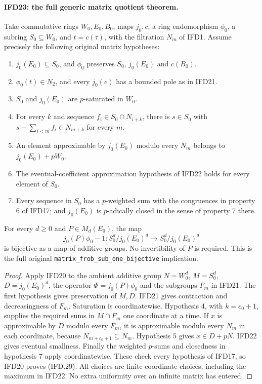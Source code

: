 \paragraph{IFD23: the full generic matrix quotient theorem.}
\label{claim:IFD23}
Take commutative rings $W_0,E_0,B_0$, maps $j_0,c$, a ring
endomorphism $\phi_0$, a subring $S_0\subseteq W_0$, and
$t=c(\tau)$, with the filtration $N_m$ of IFD1.
Assume precisely the following original matrix hypotheses:
\begin{enumerate}
\item $j_0(E_0)\subseteq S_0$, and $\phi_0$ preserves $S_0$,
      $j_0(E_0)$ and $c(B_0)$.
\item $\phi_0(t)\in N_2$, and every $j_0(e)$ has a bounded
      pole as in IFD21.
\item $S_0$ and $j_0(E_0)$ are $p$-saturated in $W_0$.
\item For every $k$ and sequence $f_i\in S_0\cap N_{i+k}$,
      there is $s\in S_0$ with
      $s-\sum_{i<m}f_i\in N_{m+k}$ for every $m$.
\item An element approximable by $j_0(E_0)$ modulo every
      $N_m$ belongs to $j_0(E_0)+pW_0$.
\item The eventual-coefficient approximation hypothesis of
      IFD22 holds for every element of $S_0$.
\item Every sequence in $S_0$ has a $p$-weighted sum with the
      congruences in property 6 of IFD17; and $j_0(E_0)$ is
      $p$-adically closed in the sense of property 7 there.
\end{enumerate}
For every $d\geq0$ and $P\in M_d(E_0)$, the map
\[
             j_0(P)\phi_0-1:S_0^d/j_0(E_0)^d
                                    \longrightarrow S_0^d/j_0(E_0)^d
                                                               \tag{IFD.29}
\]
is bijective as a map of additive groups. No invertibility of $P$
is required. This is the full original
\texttt{matrix\_frob\_sub\_one\_bijective} implication.

\begin{proof}
Apply IFD20 to the ambient additive group $N=W_0^d$,
$M=S_0^d$, $D=j_0(E_0)^d$, the operator
$\Phi=j_0(P)\phi_0$ and the subgroups $F_m$ in IFD21.
The first hypothesis gives preservation of $M,D$.
IFD21 gives contraction and decreasingness of $F_m$.
Saturation is coordinatewise. Hypothesis 4, with $k=c_0+1$,
supplies the required sums in $M\cap F_m$ one coordinate at a time.
If $x$ is approximable by $D$ modulo every $F_m$, it is
approximable modulo every $N_m$ in each coordinate, because
$N_{m+c_0+1}\subseteq N_m$. Hypothesis 5 gives $x\in D+pN$.
IFD22 gives eventual smallness. Finally the weighted $p$-sums
and closedness in hypothesis 7 apply coordinatewise.
These check every hypothesis of IFD17, so IFD20 proves (IFD.29).
All choices are finite coordinate choices, including the maximum
in IFD22. No extra uniformity over an infinite matrix has entered.
\end{proof}

